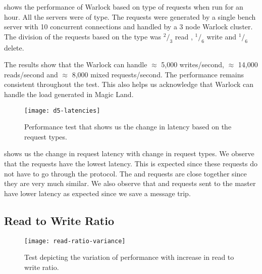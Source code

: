 shows the performance of Warlock based on
type of requests when run for an hour. All the servers were of 
type. The requests were generated by a single bench server with 10 concurrent
connections%
and handled by a 3 node Warlock cluster. The division of the
requests based on the type was ${}^2/_3$ read , ${}^1/_6$ write and ${}^1/_6$
delete.


The results show that the Warlock can handle $\approx$ 5,000 writes/second,
$\approx$ 14,000 reads/second and $\approx$ 8,000 mixed requests/second. The
performance remains consistent throughout the test. This also helps us
acknowledge that Warlock can handle the load generated in Magic Land.

\begin{figure}
  \begin{whole}
    \texttt{[image: d5-latencies]}
    \caption[General Performance Latency Test]{%
      Performance test that shows us the change in latency based on the request
      types.
    }
    \label{figure:res.general.latency}
  \end{whole}
\end{figure}

 shows us the change in request latency%
 with change in request types. We observe that the  requests have the
lowest latency. This is expected since these requests do not have to go through
the protocol. The  and  requests are close together since
they are very much similar. We also observe that  and 
requests sent to the master have lower latency as expected since we save a
message trip.

\subsection{Read to Write Ratio}

\begin{figure}
  \begin{whole}
    \texttt{[image: read-ratio-variance]}
    \caption[Read to Write Ratio Test]{%
      Test depicting the variation of performance with increase in read
      to write ratio.
    }
    \label{figure:res.read.write.ratio}
  \end{whole}
\end{figure}

